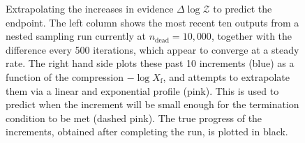 \documentclass[usenatbib]{mnras}
\begin{document}
\begin{figure}
\begin{adjustbox}{valign=t, scale=0.7}
\end{adjustbox}
\quad
\begin{adjustbox}{valign=t, scale=0.9}
\end{adjustbox}
\caption{Extrapolating the increases in evidence $\Delta \log \mathcal{Z}$ to predict the endpoint. The left column shows the most recent ten outputs from a nested sampling run currently at $n_\mathrm{dead} = 10,000$, together with the difference every 500 iterations, which appear to converge at a steady rate. The right hand side plots these past 10 increments (blue) as a function of the compression $-\log X_\mathrm{f}$, and attempts to extrapolate them via a linear and exponential profile (pink). This is used to predict when the increment will be small enough for the termination condition to be met (dashed pink). The true progress of the increments, obtained after completing the run, is plotted in black.}
\label{fig:inc_extrapolate}
\end{figure}
\end{document}
